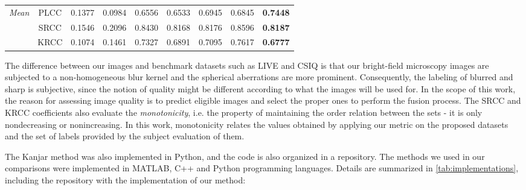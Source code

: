\begin{table}[ht]
\begin{tabular}{lcccccccc}
        \midrule
        
        \multirow{3}{*}{\textit{\small Mean}} 
        & \small PLCC & 0.1377 & 0.0984 & 0.6556 & 0.6533 & 0.6945 & 0.6845 & \textbf{0.7448}\\
        & \small SRCC & 0.1546 & 0.2096 & 0.8430 & 0.8168 & 0.8176 & 0.8596 & \textbf{0.8187}\\
        & \small KRCC & 0.1074 & 0.1461 & 0.7327 & 0.6891 & 0.7095 & 0.7617 & \textbf{0.6777}\\

        \bottomrule
    \end{tabular}
    \centering
    \fautor
\end{table}

The difference between our images and benchmark datasets such as LIVE \cite{sheikh2006statistical} and CSIQ \cite{larson2010most} is that our bright-field microscopy images are subjected to a non-homogeneous blur kernel and the spherical aberrations are more prominent. Consequently, the labeling of blurred and sharp is subjective, since the notion of quality might be different according to what the images will be used for. In the scope of this work, the reason for assessing image quality is to predict eligible images and select the proper ones to perform the fusion process. The SRCC and KRCC coefficients also evaluate the \textit{monotonicity}, i.e. the property of maintaining the order relation between the sets - it is only nondecreasing or nonincreasing. In this work, monotonicity relates the values obtained by applying our metric on the proposed datasets and the set of labels provided by the subject evaluation of them.

The Kanjar method was also implemented in Python, and the code is also organized in a repository. The methods we used in our comparisons were implemented in MATLAB, C++ and Python programming languages. Details are summarized in \autoref{tab:implementations}, including the repository with the implementation of our method:

